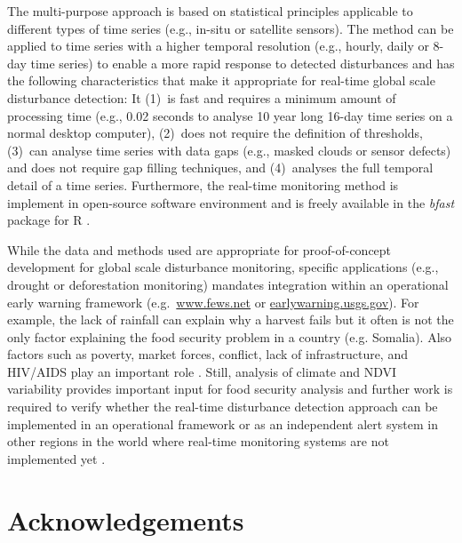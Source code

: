 \documentclass[authoryear,preprint,review,10pt]{elsarticle}
\begin{document}

The multi-purpose approach is based on statistical principles applicable to different types of time series (e.g., in-situ or satellite sensors). The method can be applied to time series with a higher temporal resolution (e.g., hourly, daily or 8-day time series) to enable a more rapid response to detected disturbances and has the following characteristics that make it appropriate for real-time global scale disturbance detection: 
It (1)~is fast and requires a minimum amount of processing time (e.g., 0.02 seconds to analyse 10 year long 16-day time series  on a normal desktop computer),
(2)~does not require the definition of thresholds, (3)~can analyse time series with data gaps (e.g., masked clouds or sensor defects) and does not require gap filling techniques, and (4)~analyses the full temporal detail of a time series. Furthermore, the real-time monitoring method is implement in open-source software environment and is freely available in the \emph{bfast} package for {R} \citep{R}.

While the data and methods used are appropriate for proof-of-concept development for global scale disturbance monitoring, specific applications (e.g., drought or deforestation monitoring) mandates integration within an operational early warning framework (e.g.\ \url{www.fews.net} or \url{earlywarning.usgs.gov}). For example, the lack of rainfall can explain why a harvest fails but it often is not the only factor explaining the food security problem in a country (e.g. Somalia).  Also factors such as poverty, market forces, conflict, lack of infrastructure, and HIV/AIDS play an important role \citep{Funk:2011fg, Vrieling:2011da}. Still, analysis of climate and NDVI variability provides important input for food security analysis and further work is required to verify whether the real-time disturbance detection approach can be implemented in an operational framework or as an independent alert system in other regions in the world where real-time monitoring systems are not implemented yet \citep{Asner:2011fa}. 

%
%



\section{Acknowledgements}
\end{document}
